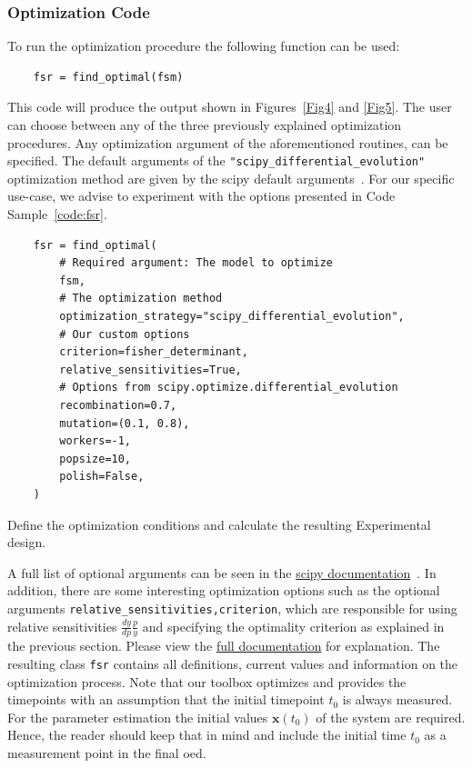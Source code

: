 \documentclass[graybox]{svmult}
\newcommand{\mbx}{\mathbf{x}}
\begin{document}
\subsubsection*{Optimization Code}
To run the optimization procedure the following function can be used:
\begin{verbatim}
    fsr = find_optimal(fsm)
\end{verbatim}
This code will produce the output shown in Figures~\ref{Fig4} and \ref{Fig5}.
The user can choose between any of the three previously explained optimization procedures.
Any optimization argument of the aforementioned routines, can be specified.
The default arguments of the \texttt{"scipy_differential_evolution"} optimization method are given by the scipy default arguments~\cite{scipydiffev}.
For our specific use-case, we advise to experiment with the options presented in Code Sample~\ref{code:fsr}.
\begin{code}[h]
    \begin{verbatim}
    fsr = find_optimal(
        # Required argument: The model to optimize
        fsm,
        # The optimization method
        optimization_strategy="scipy_differential_evolution",
        # Our custom options
        criterion=fisher_determinant,
        relative_sensitivities=True,
        # Options from scipy.optimize.differential_evolution
        recombination=0.7,
        mutation=(0.1, 0.8),
        workers=-1,
        popsize=10,
        polish=False,
    )
    \end{verbatim}
    \caption{Define the optimization conditions and calculate the resulting Experimental design.}
    \label{code:fsr}
\end{code}
A full list of optional arguments can be seen in the \href{https://docs.scipy.org/doc/scipy/reference/optimize.html#global-optimization}{scipy documentation}~\cite{virtanenSciPyFundamentalAlgorithms2020}.
In addition, there are some interesting optimization options such as the optional arguments \texttt{relative_sensitivities,criterion}, which are responsible for using relative sensitivities $\tfrac{dy}{dp}\tfrac{p}{y}$ and specifying the optimality criterion as explained in the previous section.
Please view the \href{https://spatial-systems-biology-freiburg.github.io/FisInMa/}{full documentation} for explanation.
The resulting class \texttt{fsr} contains all definitions, current values and information on the optimization process.
Note that our toolbox optimizes and provides the timepoints with an assumption that the initial timepoint $t_0$ is always measured.
For the parameter estimation the initial values $\mbx(t_0)$ of the system are required.
Hence, the reader should keep that in mind and include the initial time $t_0$ as a measurement point in the final \ac{oed}.
%
\end{document}
